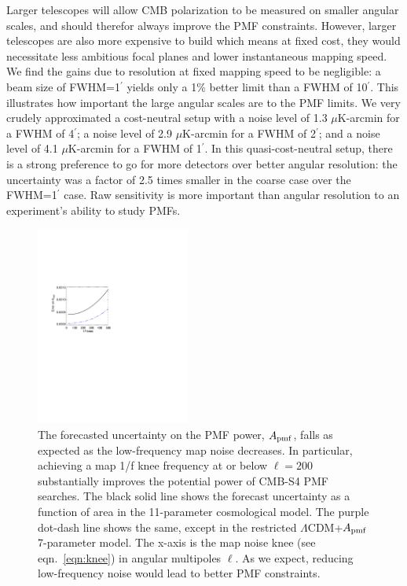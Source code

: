 \documentclass[preprint]{emulateapj}
\newcommand{\apmf}{\ensuremath{A_{\rm pmf}}}
\newcommand{\lcdm}{\ensuremath{\Lambda}CDM}
\newcommand{\ukarcmin}{\ensuremath{\mu}K-arcmin}
\begin{document}
Larger telescopes will allow CMB polarization to be measured on smaller angular scales, and should therefor always improve the PMF constraints. 
However, larger telescopes are also more expensive to build which means at fixed cost, they would necessitate less ambitious focal planes and lower instantaneous mapping speed. 
We find the gains due to resolution at fixed mapping speed to be negligible: a beam size of FWHM=1$^\prime$ yields only a 1\% better limit than a FWHM of 10$^\prime$. 
This illustrates how important the large angular scales are to the PMF limits. 
We very crudely approximated a cost-neutral setup with a noise level of 1.3 \ukarcmin{} for a FWHM of 4$^\prime$; a noise level of 2.9 \ukarcmin{} for a FWHM of 2$^\prime$; and a noise level of 4.1 \ukarcmin{} for a FWHM of 1$^\prime$. 
In this quasi-cost-neutral setup, there is a strong preference to go for more detectors over better angular resolution: the uncertainty was a factor of 2.5 times smaller in the coarse case over the FWHM=1$^\prime$ case. 
Raw sensitivity is more important than angular resolution to an experiment's ability to study PMFs.

\begin{figure}[htb]\centering
\includegraphics[width=0.45\textwidth,clip,trim={1.5cm 12.5cm 11cm 7.5cm}]{pmf_knee.pdf}
  \caption[Map knee dependence]{
  The forecasted uncertainty on the PMF power, \apmf{}, falls as expected as the low-frequency map noise decreases.  
  In particular, achieving a map 1/f knee frequency at or below $\ell = 200$ substantially improves the potential power of CMB-S4 PMF searches. 
  The black solid line shows the forecast uncertainty as a function of area in the 11-parameter cosmological model.
  The purple dot-dash line shows the same, except in the restricted \lcdm{}+\apmf{} 7-parameter model. 
  The x-axis is the map noise knee (see eqn.~\ref{eqn:knee}) in angular multipoles $\ell$. 
  As we expect, reducing low-frequency noise would lead to better PMF constraints. 
    \label{fig:knee}
  }
\end{figure}
\end{document}

